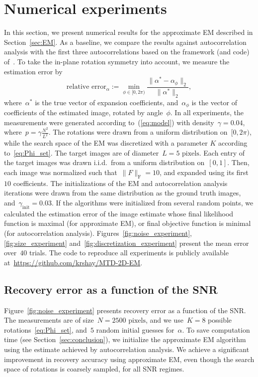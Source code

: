\documentclass{article}
\begin{document}
\section{Numerical experiments}
\label{sec:numeric}
In this section, we present numerical results for the approximate EM described in Section~\ref{sec:EM}. As a baseline, we compare the results against autocorrelation analysis with the first three autocorrelations based on the framework (and code) of~\cite{marshall2020image, bendory2021multi, kreymer2021two}.
 To take the in-plane rotation symmetry into account, we measure the estimation error by
\begin{equation}
\label{eq:err_z}
\text{relative error}_{\alpha} := \min_{\phi \in [0, 2\pi)} \frac{\|\alpha^* - \alpha_{\phi}\|_2}{\|\alpha^*\|_2},
\end{equation}
where~$\alpha^*$ is the true vector of expansion coefficients, and~$\alpha_{\phi}$ is the vector of coefficients of the estimated image, rotated by angle~$\phi$. In all experiments, the measurements were generated according to~(\ref{eq:model}) with density~\mbox{$\gamma = 0.04$}, where~\mbox{$p = \gamma \frac{N^2}{L^2}$}. The rotations  were drawn from a uniform distribution on~$[0, 2\pi)$, while the search space of the EM was discretized with a parameter $K$ according to~\eqref{eq:Phi_set}.
 The target images are of diameter~\mbox{$L = 5 \text{ pixels}$}. Each entry of the target images was drawn i.i.d.\ from a uniform distribution on~$[0,1]$. Then, each image was normalized such that~\mbox{$\|F\|_\text{F} = 10$}, and expanded using its first~$10$ coefficients. The initializations of the EM and autocorrelation analysis iterations were drawn from the same distribution as the ground truth images, and~\mbox{$\gamma_{\text{init}} = 0.03$}.
 If the algorithms were initialized from several random  points,
we calculated the estimation error of the image estimate whose final likelihood function is maximal (for approximate EM), or final objective function is minimal (for autocorrelation analysis). Figures~\ref{fig:noise_experiment}, \ref{fig:size_experiment} and~\ref{fig:discretization_experiment} present the mean error over~$40$ trials. The code to reproduce all experiments is publicly available at~\url{https://github.com/krshay/MTD-2D-EM}.

\subsection{Recovery error as a function of the SNR}
\label{subsec:exp_SNR}
Figure~\ref{fig:noise_experiment} presents recovery error as a function of the SNR. The measurements are of size~\mbox{$N = 2500 \text{ pixels}$}, and we use~\mbox{$K = 8$} possible rotations~\eqref{eq:Phi_set}, and~$5$ random initial guesses for~$\alpha$. To save computation time (see Section~\ref{sec:conclusion}), we initialize the approximate EM algorithm using the estimate achieved by autocorrelation analysis. We achieve a significant improvement in recovery accuracy using approximate EM, even though the search space of rotations is coarsely sampled, for all SNR regimes.
\end{document}

